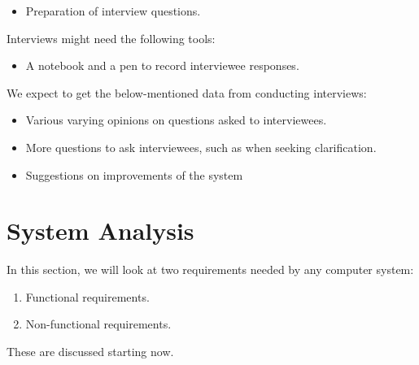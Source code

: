 \documentclass[12pt,svgnames,smaller]{article} %
\begin{document}
\begin{enumerate}
		\begin{itemize}
			\item Preparation of interview questions.
		\end{itemize}
		
		Interviews might need the following tools:
		
		\begin{itemize}
			\item A notebook and a pen to record interviewee responses.
		\end{itemize}
		
		We expect to get the below-mentioned data from conducting interviews:
		
		\begin{itemize}
			\item Various varying opinions on questions asked to interviewees.
			\item More questions to ask interviewees, such as when seeking clarification.
			\item Suggestions on improvements of the system 
		\end{itemize}
		
		
	\end{enumerate}
	
	
	\clearpage
	
	
	\section{\textbf{System Analysis} } 
	
	In this section, we will look at two requirements needed by any computer system:
	
	\begin{enumerate}
		\item Functional requirements.
		\item Non-functional requirements.
	\end{enumerate}
	
	These are discussed starting now.
	
\end{document}
